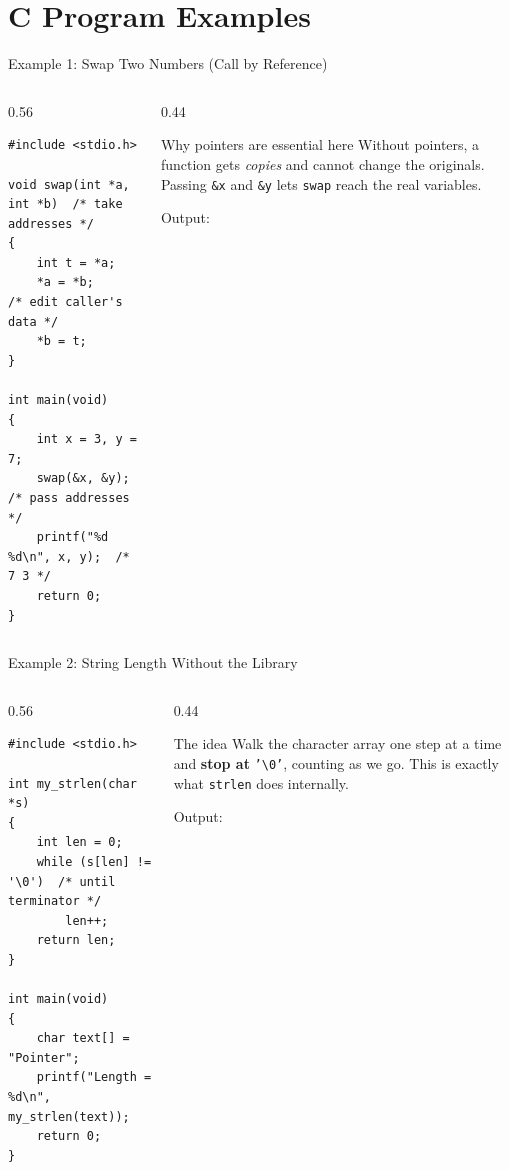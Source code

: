 \documentclass[aspectratio=169]{beamer}
\begin{document}
	\section{C Program Examples}
	\begin{frame}[fragile]{Example 1: Swap Two Numbers (Call by Reference)}
		\begin{columns}[T]
			\begin{column}{0.56\textwidth}
				\begin{lstlisting}
#include <stdio.h>

void swap(int *a, int *b)  /* take addresses */
{
    int t = *a;
    *a = *b;               /* edit caller's data */
    *b = t;
}

int main(void)
{
    int x = 3, y = 7;
    swap(&x, &y);          /* pass addresses */
    printf("%d %d\n", x, y);  /* 7 3 */
    return 0;
}
				\end{lstlisting}
			\end{column}
			\begin{column}{0.44\textwidth}
				\begin{block}{Why pointers are essential here}
					\small Without pointers, a function gets \emph{copies} and cannot change the originals.
					Passing \texttt{\&x} and \texttt{\&y} lets \texttt{swap} reach the real variables.
				\end{block}
				\centering\footnotesize Output:\; 
			\end{column}
		\end{columns}
	\end{frame}

	\begin{frame}[fragile]{Example 2: String Length Without the Library}
		\begin{columns}[T]
			\begin{column}{0.56\textwidth}
				\begin{lstlisting}
#include <stdio.h>

int my_strlen(char *s)
{
    int len = 0;
    while (s[len] != '\0')  /* until terminator */
        len++;
    return len;
}

int main(void)
{
    char text[] = "Pointer";
    printf("Length = %d\n", my_strlen(text));
    return 0;
}
				\end{lstlisting}
			\end{column}
			\begin{column}{0.44\textwidth}
				\begin{block}{The idea}
					\small Walk the character array one step at a time and \textbf{stop at} \texttt{'\textbackslash 0'},
					counting as we go. This is exactly what \texttt{strlen} does internally.
				\end{block}
				\centering\footnotesize Output:\; 
			\end{column}
		\end{columns}
	\end{frame}
\end{document}
